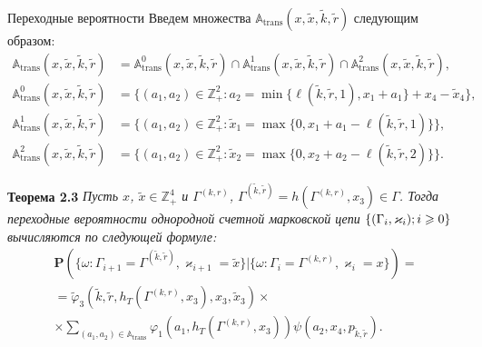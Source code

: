 \documentclass[10pt]{beamer}
\newcommand{\Mark}{\{(\Gamma_i, \varkappa_i); \hm{} i \geqslant 0\}}
\newcommand*{\hm}[1]{#1\nobreak\discretionary{}%
	{\hbox{$\mathsurround=0pt #1$}}{}}%
\renewcommand{\Pr}{{\mathbf P}}
\begin{document}
\begin{frame}[allowframebreaks]{Переходные вероятности}
Введем множества ${\mathbb A}_{\mathrm{trans}}(x,\tilde{x},\tilde{k},\tilde{r})$  следующим образом:
\begin{align}
{\mathbb A}_{\mathrm{trans}}(x,\tilde{x},\tilde{k},\tilde{r}) &= {\mathbb A}_{\mathrm{trans}}^0(x,\tilde{x},\tilde{k},\tilde{r}) \cap {\mathbb A}_{\mathrm{trans}}^1(x,\tilde{x},\tilde{k},\tilde{r})\cap {\mathbb A}_{\mathrm{trans}}^2(x,\tilde{x},\tilde{k},\tilde{r}),\label{A:trans:1}\\
{\mathbb A}_{\mathrm{trans}}^0(x,\tilde{x},\tilde{k},\tilde{r}) &= \{(a_1,a_2) \in \mathbb{Z}_+^2 \colon a_2 = \min{\{\ell(\tilde{k},\tilde{r},1), x_1+a_1}\} +x_4-\tilde{x}_4\},\\
{\mathbb A}_{\mathrm{trans}}^1(x,\tilde{x},\tilde{k},\tilde{r}) &= \{(a_1,a_2) \in \mathbb{Z}_+^2 \colon \tilde{x}_1=\max{\{0,x_1+a_1-\ell(\tilde{k},\tilde{r},1)\}}\},\\
{\mathbb A}_{\mathrm{trans}}^2(x,\tilde{x},\tilde{k},\tilde{r}) &= \{(a_1,a_2) \in \mathbb{Z}_+^2 \colon  \tilde{x}_2=\max{\{0,x_2+a_2-\ell(\tilde{k},\tilde{r},2)\}}\}.\label{A:trans:2}
\end{align}
\framebreak 

 {\bf Теорема 2.3}
{\it 
Пусть $x$, $\tilde{x}\in \mathbb{Z}_+^4$ и $\Gamma^{(k,r)}$, $\Gamma^{(\tilde{k},\tilde{r})}=h(\Gamma^{(k,r)},x_3) \in \Gamma$. Тогда переходные вероятности однородной счетной марковской цепи $\Mark$ вычисляются по следующей формуле:
\begin{multline}
\Pr (\{\omega\colon \Gamma_{i+1}=\Gamma^{(\tilde{k},\tilde{r})},\varkappa_{i+1}=\tilde{x} \}| \{\omega\colon \Gamma_{i}=\Gamma^{(k,r)},\varkappa_i=x\})=\\ 
=\widetilde{\varphi}_3(\tilde{k},\tilde{r},h_T(\Gamma^{(k,r)},x_3),x_3,\tilde{x}_3)\times \\ \times
\sum_{(a_1,a_2)\in {\mathbb A}_{\mathrm{trans}}}\varphi_1(a_1,h_T(\Gamma^{(k,r)},x_3))  \psi(a_2,x_4, p_{\tilde{k},\tilde{r}}).
\label{transitionToProve}
\end{multline}
}

\end{frame}
\end{document}
